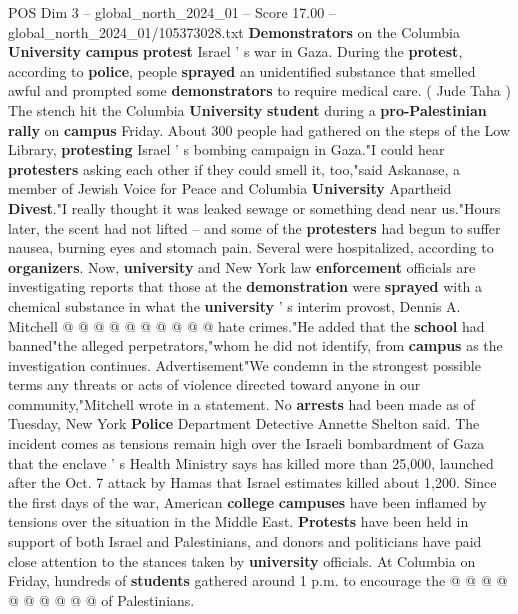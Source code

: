 \begin{textsample}{POS Dim 3 – global\_north\_2024\_01 – Score 17.00 – global\_north\_2024\_01/105373028.txt}  \label{ex:f3_pos_239}
\textbf{Demonstrators} on the Columbia \textbf{University} \textbf{campus} \textbf{protest} Israel ' s war in Gaza.
During the \textbf{protest}, according to \textbf{police}, people \textbf{sprayed} an unidentified substance that smelled awful and prompted some \textbf{demonstrators} to require medical care. ( Jude Taha ) The stench hit the Columbia \textbf{University} \textbf{student} during a \textbf{pro-Palestinian} \textbf{rally} on \textbf{campus} Friday.
About 300 people had gathered on the steps of the Low Library, \textbf{protesting} Israel ' s bombing campaign in Gaza."I could hear \textbf{protesters} asking each other if they could smell it, too,"said Askanase, a member of Jewish Voice for Peace and Columbia \textbf{University} Apartheid \textbf{Divest}."I really thought it was leaked sewage or something dead near us."Hours later, the scent had not lifted -- and some of the \textbf{protesters} had begun to suffer nausea, burning eyes and stomach pain.
Several were hospitalized, according to \textbf{organizers}.
Now, \textbf{university} and New York law \textbf{enforcement} officials are investigating reports that those at the \textbf{demonstration} were \textbf{sprayed} with a chemical substance in what the \textbf{university} ' s interim provost, Dennis A.
Mitchell @ @ @ @ @ @ @ @ @ @ hate crimes."He added that the \textbf{school} had banned"the alleged perpetrators,"whom he did not identify, from \textbf{campus} as the investigation continues.
Advertisement"We condemn in the strongest possible terms any threats or acts of violence directed toward anyone in our community,"Mitchell wrote in a statement.
No \textbf{arrests} had been made as of Tuesday, New York \textbf{Police} Department Detective Annette Shelton said.
The incident comes as tensions remain high over the Israeli bombardment of Gaza that the enclave ' s Health Ministry says has killed more than 25,000, launched after the Oct. 7 attack by Hamas that Israel estimates killed about 1,200.
Since the first days of the war, American \textbf{college} \textbf{campuses} have been inflamed by tensions over the situation in the Middle East. \textbf{Protests} have been held in support of both Israel and Palestinians, and donors and politicians have paid close attention to the stances taken by \textbf{university} officials.
At Columbia on Friday, hundreds of \textbf{students} gathered around 1 p.m. to encourage the @ @ @ @ @ @ @ @ @ @ of Palestinians.

\end{textsample}

